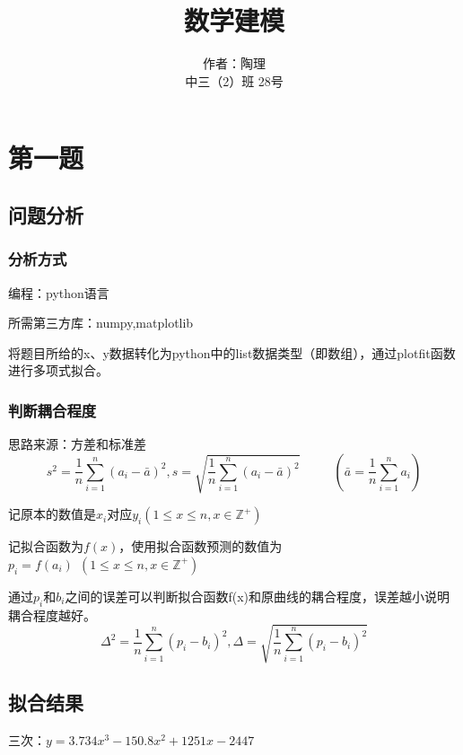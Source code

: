 \documentclass[lang=cn,a4paper]{elegantpaper}
\title{数学建模}
\author{作者：陶理 \\ 中三（2）班  28号}
\institute{上海市实验学校}
\date{\zhtoday}
\begin{document}
    \maketitle

    \section{第一题}
    \subsection{问题分析}
    \subsubsection*{分析方式}
    编程：python语言

    所需第三方库：numpy,matplotlib
    
    将题目所给的x、y数据转化为python中的list数据类型（即数组），通过plotfit函数进行多项式拟合。
    \subsubsection*{判断耦合程度}
    思路来源：方差和标准差
    $$
    s^2=\frac{1}{n}\sum_{i=1}^n (a_i-\bar{a})^2,s=\sqrt{\frac{1}{n}\sum_{i=1}^n (a_i-\bar{a})^2}~~~~~~~~~~~~(\bar{a}=\frac{1}{n}\sum_{i=1}^n a_i)
    $$

    记原本的数值是$x_i$对应$y_i(1\leqslant x\leqslant n,x\in \mathbb{Z}^+)$

    记拟合函数为$f(x)$，使用拟合函数预测的数值为$p_i=f(a_i)~~(1\leqslant x\leqslant n,x\in \mathbb{Z}^+)$
    
    通过$p_i$和$b_i$之间的误差可以判断拟合函数f(x)和原曲线的耦合程度，误差越小说明耦合程度越好。
    $$
    \Delta^2=\frac{1}{n}\sum_{i=1}^n (p_i-b_i)^2, \Delta=\sqrt{\frac{1}{n}\sum_{i=1}^n (p_i-b_i)^2}
    $$
    \subsection{拟合结果}
    三次：$y=3.734x^3-150.8x^2+1251x-2447$
\end{document}
